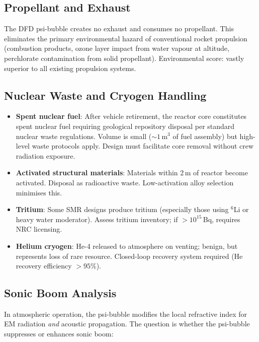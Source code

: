 \documentclass[11pt,a4paper]{article}
\begin{document}
\subsection{Propellant and Exhaust}

The DFD psi-bubble creates no exhaust and consumes no propellant.
This eliminates the primary environmental hazard of conventional
rocket propulsion (combustion products, ozone layer impact from
water vapour at altitude, perchlorate contamination from solid
propellant). Environmental score: vastly superior to all existing
propulsion systems.

\subsection{Nuclear Waste and Cryogen Handling}

\begin{itemize}
  \item \textbf{Spent nuclear fuel}: After vehicle retirement, the
    reactor core constitutes spent nuclear fuel requiring geological
    repository disposal per standard nuclear waste regulations.
    Volume is small ($\sim 1$\,m$^3$ of fuel assembly) but high-level
    waste protocols apply. Design must facilitate core removal without
    crew radiation exposure.
  \item \textbf{Activated structural materials}: Materials within
    2\,m of reactor become activated. Disposal as radioactive waste.
    Low-activation alloy selection minimises this.
  \item \textbf{Tritium}: Some SMR designs produce tritium (especially
    those using $^6$Li or heavy water moderator). Assess tritium
    inventory; if $> 10^{15}$\,Bq, requires NRC licensing.
  \item \textbf{Helium cryogen}: He-4 released to atmosphere on
    venting; benign, but represents loss of rare resource. Closed-loop
    recovery system required (He recovery efficiency $> 95\%$).
\end{itemize}

\subsection{Sonic Boom Analysis}

In atmospheric operation, the psi-bubble modifies the local refractive
index for EM radiation \textit{and} acoustic propagation. The question
is whether the psi-bubble suppresses or enhances sonic boom:
\end{document}
